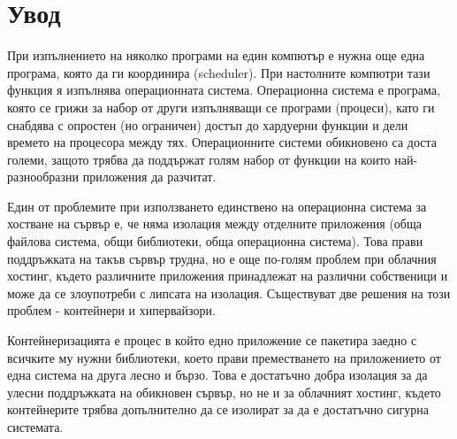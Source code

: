 \chapter*{Увод}


При изпълнението на няколко програми на един компютър е нужна още една програма, която да ги координира (scheduler). При настолните компютри тази функция я изпълнява операционната система.
Операционна система е програма, която се грижи за набор от други изпълняващи се програми (процеси), като ги снабдява с опростен (но ограничен) достъп до хардуерни функции и дели времето на процесора между тях. Операционните системи обикновено са доста големи, защото трябва да поддържат голям набор от функции на които най-разнообразни приложения да разчитат.

Един от проблемите при използването единствено на операционна система за хостване на сървър е, че няма изолация между отделните приложения (обща файлова система, общи библиотеки, обща операционна система). Това прави поддръжката на такъв сървър трудна, но е още по-голям проблем при облачния хостинг, където различните приложения принадлежат на различни собственици и може да се злоупотреби с липсата на изолация.
Съществуват две решения на този проблем - контейнери и хипервайзори.

Контейнеризацията е процес в който едно приложение се пакетира заедно с всичките му нужни библиотеки, което прави преместването на приложението от една система на друга лесно и бързо. Това е достатъчно добра изолация за да улесни поддръжката на обикновен сървър, но не и за облачният хостинг, където контейнерите трябва допълнително да се изолират за да е достатъчно сигурна системата.


